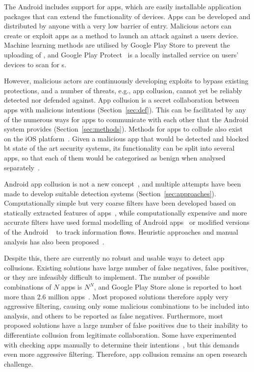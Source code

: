 \documentclass[article, oneside]{aaltoseries}
\newcommand{\Sref}[1]{Section~\ref{#1}}
\renewcommand\gls\cgls \renewcommand\glspl\cglspl
\begin{document}
The Android \gls{os} includes support for apps, which are
easily installable application packages that can extend the
functionality of devices. Apps can be developed and
distributed by anyone with a very low barrier of entry.
Malicious actors can create or exploit apps as a method to
launch an attack against a users device. Machine learning
methods are utilised by Google Play Store to prevent the
uploading of \gls{pha}, and Google Play
Protect~\cite{AOSPplayprotect} is a locally installed
service on users' devices to scan for \gls{pha}s.

However, malicious actors are continuously developing
exploits to bypass existing protections, and a number of
threats, e.g., app collusion, cannot yet be reliably
detected nor defended against. App collusion is a secret
collaboration between apps with malicious intentions
(\Sref{sec:def}). This can be facilitated by any of the
numerous ways for apps to communicate with each other that
the Android system provides (\Sref{sec:methods}). Methods
for apps to collude also exist on the iOS
platform~\cite{Deshotels2016}. Given a malicious app that
would be detected and blocked bt state of the art security
systems, its functionality can be split into several apps,
so that each of them would be categorised as benign when
analysed separately~\cite{Chen2018}.

Android app collusion is not a new
concept~\cite{Schlegel2011}, and multiple attempts have been
made to develop suitable detection systems
(\Sref{sec:approaches}). Computationally simple but very
coarse filters have been developed based on statically
extracted features of apps~\cite{Asavoae2016, Chen2018},
while computationally expensive and more accurate filters
have used formal modelling of Android
apps~\cite{Asavoae2018} or modified versions of the Android
\gls{os}~\cite{Enck2014} to track information flows.
Heuristic approaches and manual analysis has also been
proposed~\cite{Muttik2016}.

Despite this, there are currently no robust and usable ways
to detect app collusions. Existing solutions have large
number of false negatives, false positives, or they are
infeasibly difficult to implement. The number of possible
combinations of $N$ apps is $N^N$, and Google Play Store
alone is reported to host more than 2.6 million
apps~\cite{Statista2018}. Most proposed solutions therefore
apply very aggressive filtering, causing only some malicious
combinations to be included into analysis, and others to be
reported as false negatives. Furthermore, most proposed
solutions have a large number of false positives due to
their inability to differentiate collusion from legitimate
collaboration. Some have experimented with checking apps
manually to determine their intentions~\cite{Muttik2016},
but this demands even more aggressive filtering. Therefore,
app collusion remains an open research challenge.
\end{document}
